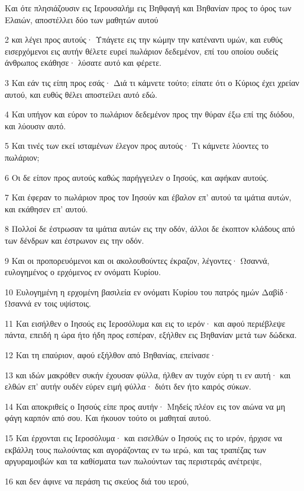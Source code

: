 \par Και ότε πλησιάζουσιν εις Ιερουσαλήμ εις Βηθφαγή και Βηθανίαν προς το όρος των Ελαιών, αποστέλλει δύο των μαθητών αυτού
\par 2 και λέγει προς αυτούς· Υπάγετε εις την κώμην την κατέναντι υμών, και ευθύς εισερχόμενοι εις αυτήν θέλετε ευρεί πωλάριον δεδεμένον, επί του οποίου ουδείς άνθρωπος εκάθησε· λύσατε αυτό και φέρετε.
\par 3 Και εάν τις είπη προς εσάς· Διά τι κάμνετε τούτο; είπατε ότι ο Κύριος έχει χρείαν αυτού, και ευθύς θέλει αποστείλει αυτό εδώ.
\par 4 Και υπήγον και εύρον το πωλάριον δεδεμένον προς την θύραν έξω επί της διόδου, και λύουσιν αυτό.
\par 5 Και τινές των εκεί ισταμένων έλεγον προς αυτούς· Τι κάμνετε λύοντες το πωλάριον;
\par 6 Οι δε είπον προς αυτούς καθώς παρήγγειλεν ο Ιησούς, και αφήκαν αυτούς.
\par 7 Και έφεραν το πωλάριον προς τον Ιησούν και έβαλον επ' αυτού τα ιμάτια αυτών, και εκάθησεν επ' αυτού.
\par 8 Πολλοί δε έστρωσαν τα ιμάτια αυτών εις την οδόν, άλλοι δε έκοπτον κλάδους από των δένδρων και έστρωνον εις την οδόν.
\par 9 Και οι προπορευόμενοι και οι ακολουθούντες έκραζον, λέγοντες· Ωσαννά, ευλογημένος ο ερχόμενος εν ονόματι Κυρίου.
\par 10 Ευλογημένη η ερχομένη βασιλεία εν ονόματι Κυρίου του πατρός ημών Δαβίδ· Ωσαννά εν τοις υψίστοις.
\par 11 Και εισήλθεν ο Ιησούς εις Ιεροσόλυμα και εις το ιερόν· και αφού περιέβλεψε πάντα, επειδή η ώρα ήτο ήδη προς εσπέραν, εξήλθεν εις Βηθανίαν μετά των δώδεκα.
\par 12 Και τη επαύριον, αφού εξήλθον από Βηθανίας, επείνασε·
\par 13 και ιδών μακρόθεν συκήν έχουσαν φύλλα, ήλθεν αν τυχόν εύρη τι εν αυτή· και ελθών επ' αυτήν ουδέν εύρεν ειμή φύλλα· διότι δεν ήτο καιρός σύκων.
\par 14 Και αποκριθείς ο Ιησούς είπε προς αυτήν· Μηδείς πλέον εις τον αιώνα να μη φάγη καρπόν από σου. Και ήκουον τούτο οι μαθηταί αυτού.
\par 15 Και έρχονται εις Ιεροσόλυμα· και εισελθών ο Ιησούς εις το ιερόν, ήρχισε να εκβάλλη τους πωλούντας και αγοράζοντας εν τω ιερώ, και τας τραπέζας των αργυραμοιβών και τα καθίσματα των πωλούντων τας περιστεράς ανέτρεψε,
\par 16 και δεν άφινε να περάση τις σκεύος διά του ιερού,
